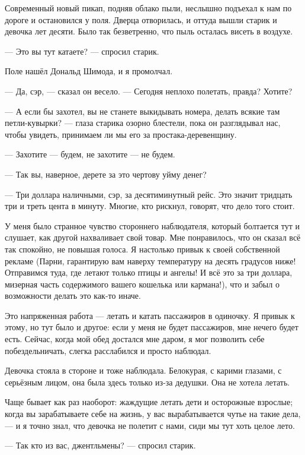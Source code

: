 Современный новый пикап, подняв облако пыли, неслышно подъехал к нам по дороге и остановился у поля. Дверца отворилась, и оттуда вышли старик и девочка лет десяти. Было так безветренно, что пыль осталась висеть в воздухе.

--- Это вы тут катаете? --- спросил старик.

Поле нашёл Дональд Шимода, и я промолчал.

--- Да, сэр, --- сказал он весело. --- Сегодня неплохо полетать, правда? Хотите?

--- А если бы захотел, вы не станете выкидывать номера, делать всякие там петли-кувырки? --- глаза старика озорно блестели, пока он разглядывал нас, чтобы увидеть, принимаем ли мы его за простака-деревенщину.

--- Захотите --- будем, не захотите --- не будем.

--- Так вы, наверное, дерете за это чертову уйму денег?

--- Три доллара наличными, сэр, за десятиминутный рейс. Это значит тридцать три и треть цента в минуту. Многие, кто рискнул, говорят, что дело того стоит.

У меня было странное чувство стороннего наблюдателя, который болтается тут и слушает, как другой
нахваливает свой товар. Мне понравилось, что он сказал всё так спокойно, не повышая голоса. Я
настолько привык к своей собственной рекламе (Парни, гарантирую вам наверху температуру на десять
градусов ниже! Отправимся туда, где летают только птицы и ангелы! И всё это за три доллара, мизерная часть содержимого вашего кошелька или кармана!), что и забыл о возможности делать это как-то иначе.

Это напряженная работа --- летать и катать пассажиров в одиночку. Я привык к этому, но тут было и другое: если у меня не будет пассажиров, мне нечего будет есть. Сейчас, когда мой обед достался мне даром, я мог позволить себе побездельничать, слегка расслабился и просто наблюдал.

Девочка стояла в стороне и тоже наблюдала. Белокурая, с карими глазами, с серьёзным лицом, она была здесь только из-за дедушки. Она не хотела летать.

Чаще бывает как раз наоборот: жаждущие летать дети и осторожные взрослые; когда вы зарабатываете себе на жизнь, у вас вырабатывается чутье на такие дела, --- и я точно знал, что девочка не полетит с нами, сиди мы тут хоть целое лето.

--- Так кто из вас, джентльмены? --- спросил старик.


